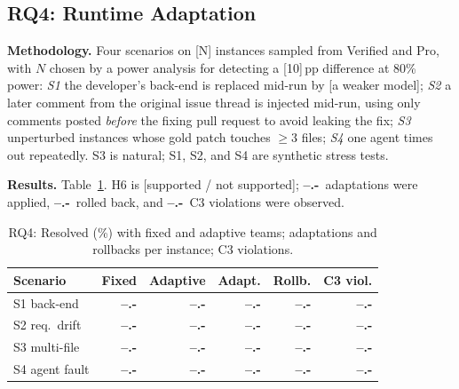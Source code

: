 \documentclass[10pt, anonymous, conference]{IEEEtran}
\theoremstyle{definition}
\theoremstyle{plain}
\theoremstyle{remark}
\newcommand{\fixme}[1]{{\color{red}[#1]}}
\newcommand{\ph}{{\color{red}\textbf{--.-}}}     %
\newcommand{\hyp}[1]{{\color{blue}#1}}           %
\begin{document}
\subsection{RQ4: Runtime Adaptation}\label{subsec:rq4}
\noindent\textbf{Methodology.} Four scenarios on \fixme{N} instances sampled
from Verified and Pro, with $N$ chosen by a power analysis for detecting a
\fixme{10}\,pp difference at 80\% power: \emph{S1} the developer's back-end is
replaced mid-run by \fixme{a weaker model}; \emph{S2} a later comment from the
original issue thread is injected mid-run, using only comments posted
\emph{before} the fixing pull request to avoid leaking the fix; \emph{S3}
unperturbed instances whose gold patch touches $\ge3$ files; \emph{S4} one
agent times out repeatedly. S3 is natural; S1, S2, and S4 are synthetic
stress tests.

\noindent\textbf{Results.} Table~\ref{tab:adapt}. \hyp{H6 is [supported /
not supported]; \ph\ adaptations were applied, \ph\ rolled back, and \ph\ C3
violations were observed.}

\begin{table}[t]
\centering
\caption{RQ4: Resolved (\%) with fixed and adaptive teams; adaptations and
rollbacks per instance; C3 violations.}
\label{tab:adapt}
\footnotesize
\setlength{\tabcolsep}{3pt}
\begin{tabular}{@{}l r r r r r@{}}
\toprule
Scenario & Fixed & Adaptive & Adapt. & Rollb. & C3 viol. \\
\midrule
S1 back-end     & \ph & \ph & \ph & \ph & \ph \\
S2 req.\ drift  & \ph & \ph & \ph & \ph & \ph \\
S3 multi-file   & \ph & \ph & \ph & \ph & \ph \\
S4 agent fault  & \ph & \ph & \ph & \ph & \ph \\
\bottomrule
\end{tabular}
\end{table}

\end{document}

